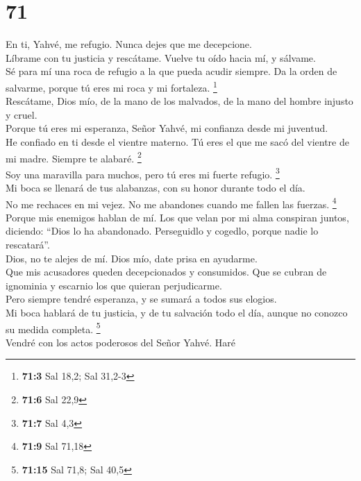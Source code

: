 \hypertarget{section-69}{%
\section{71}\label{section-69}}

 En ti, Yahvé, me refugio. Nunca dejes que me
decepcione.\\
 Líbrame con tu justicia y rescátame. Vuelve tu oído hacia
mí, y sálvame.\\
 Sé para mí una roca de refugio a la que pueda acudir
siempre. Da la orden de salvarme, porque tú eres mi roca y mi fortaleza.
\footnote{\textbf{71:3} Sal 18,2; Sal 31,2-3}\\
 Rescátame, Dios mío, de la mano de los malvados, de la
mano del hombre injusto y cruel.\\
 Porque tú eres mi esperanza, Señor Yahvé, mi confianza
desde mi juventud.\\
 He confiado en ti desde el vientre materno. Tú eres el
que me sacó del vientre de mi madre. Siempre te alabaré. \footnote{\textbf{71:6}
  Sal 22,9}\\
 Soy una maravilla para muchos, pero tú eres mi fuerte
refugio. \footnote{\textbf{71:7} Sal 4,3}\\
 Mi boca se llenará de tus alabanzas, con su honor durante
todo el día.\\
 No me rechaces en mi vejez. No me abandones cuando me
fallen las fuerzas. \footnote{\textbf{71:9} Sal 71,18}\\
 Porque mis enemigos hablan de mí. Los que velan por mi
alma conspiran juntos,\\
 diciendo: ``Dios lo ha abandonado. Perseguidlo y
cogedlo, porque nadie lo rescatará''.\\
 Dios, no te alejes de mí. Dios mío, date prisa en
ayudarme.\\
 Que mis acusadores queden decepcionados y consumidos.
Que se cubran de ignominia y escarnio los que quieran perjudicarme.\\
 Pero siempre tendré esperanza, y se sumará a todos sus
elogios.\\
 Mi boca hablará de tu justicia, y de tu salvación todo
el día, aunque no conozco su medida completa. \footnote{\textbf{71:15}
  Sal 71,8; Sal 40,5}\\
 Vendré con los actos poderosos del Señor Yahvé. Haré
